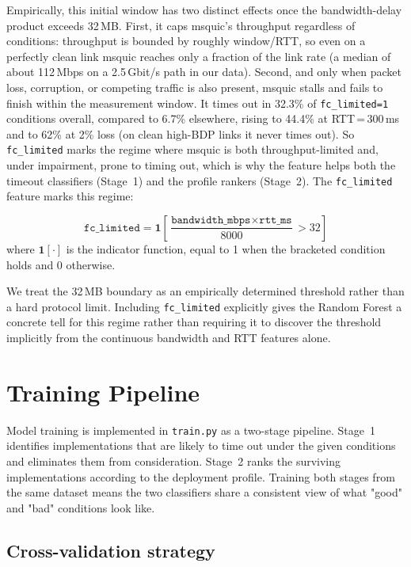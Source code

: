 Empirically, this initial window has two distinct effects once the
bandwidth-delay product exceeds 32\,MB. First, it caps msquic's throughput
regardless of conditions: throughput is bounded by roughly window/RTT, so even
on a perfectly clean link msquic reaches only a fraction of the link rate (a
median of about 112\,Mbps on a 2.5\,Gbit/s path in our data). Second, and only
when packet loss, corruption, or competing traffic is also present, msquic
stalls and fails to finish within the measurement window. It times out in 32.3\%
of \texttt{fc\_limited=1} conditions overall, compared to 6.7\% elsewhere, rising
to 44.4\% at RTT\,=\,300\,ms and to 62\% at 2\% loss (on clean high-BDP links it
never times out). So \texttt{fc\_limited} marks the regime where msquic is both
throughput-limited and, under impairment, prone to timing out, which is why the
feature helps both the timeout classifiers (Stage~1) and the profile rankers
(Stage~2). The \texttt{fc\_limited} feature marks this regime:

\[
    \texttt{fc\_limited} = \mathbf{1}\!\left[ \frac{\texttt{bandwidth\_mbps} \times
    \texttt{rtt\_ms}}{8000} > 32 \right]
\]
where $\mathbf{1}[\cdot]$ is the indicator function, equal to 1 when the
bracketed condition holds and 0 otherwise.

We treat the 32\,MB boundary as an empirically determined threshold rather than
a hard protocol limit. Including \texttt{fc\_limited} explicitly gives the
Random Forest a concrete tell for this regime rather than requiring it to
discover the threshold implicitly from the continuous bandwidth and RTT
features alone.

\section{Training Pipeline}
\label{sec:training}

Model training is implemented in \texttt{train.py} as a two-stage pipeline.
Stage~1 identifies implementations that are likely to time out under the given
conditions and eliminates them from consideration. Stage~2 ranks the surviving
implementations according to the deployment profile. Training both stages from
the same dataset means the two classifiers share a consistent view of what
"good" and "bad" conditions look like.

\subsection{Cross-validation strategy}
\label{subsec:cv}

